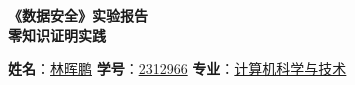 \documentclass[a4paper]{article}
\begin{document}
\renewcommand{\contentsname}{目\ 录}
\renewcommand{\appendixname}{附录}
\renewcommand{\appendixpagename}{附录}
\renewcommand{\refname}{参考文献} 
\renewcommand{\figurename}{图}
\renewcommand{\tablename}{表}
\renewcommand{\today}{\number\year 年 \number\month 月 \number\day 日}


\renewcommand {\thefigure}{\thesection{}.\arabic{figure}}%
\renewcommand{\figurename}{图}
\renewcommand{\contentsname}{目录}  

\renewcommand{\abstractname}{\textbf{\Large 摘要}} %

\newpage
\begin{center}
    \huge{\textbf{《数据安全》实验报告}}\\
    \vspace {0.5em}
    \Large {\textbf {零知识证明实践}}%
\end{center}


\begin{center}
    \textbf{姓名}：\underline{林晖鹏} \quad
    \textbf{学号}：\underline{2312966} \quad
    \textbf{专业}：\underline{计算机科学与技术}
\end{center}

\vspace{1em} %

\tableofcontents




\end{document}

